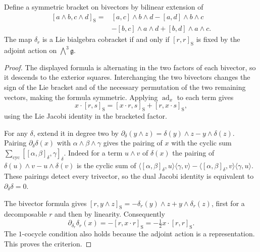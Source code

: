 \begin{proposition}
\label{res:LD05}
Define a symmetric bracket on bivectors by bilinear extension of
\[
 \begin{aligned}
 [a\wedge b,c\wedge d]_{\mathrm S}
   ={}&[a,c]\wedge b\wedge d-[a,d]\wedge b\wedge c\\
      &-[b,c]\wedge a\wedge d+[b,d]\wedge a\wedge c .
 \end{aligned}
\]
The map \(\delta_r\) is a Lie bialgebra cobracket if and only if
\([r,r]_{\mathrm S}\) is fixed by the adjoint action
on \(\bigwedge^3\mathfrak g\).
\end{proposition}
\begin{proof}
The displayed formula is alternating in the two factors of
each bivector, so it descends to the exterior squares.
Interchanging the two bivectors changes the sign of the Lie
bracket and of the necessary permutation of the two remaining
vectors, making the formula symmetric. Applying
\(\operatorname{ad}_x\) to each term gives
\[
 x\cdot[r,s]_{\mathrm S}=[x\cdot r,s]_{\mathrm S}
                         +[r,x\cdot s]_{\mathrm S},
\]
using the Lie Jacobi identity in the bracketed factor.

For any \(\delta\), extend it in degree two by
\(\partial_\delta(y\wedge z)=\delta(y)\wedge z-y\wedge\delta(z)\).
Pairing \(\partial_\delta\delta(x)\) with \(\alpha\wedge\beta\wedge\gamma\)
gives the pairing of \(x\) with the cyclic sum
\(\sum_{\mathrm{cyc}}[[\alpha,\beta]_\delta,\gamma]_\delta\).
Indeed for a term \(u\wedge v\) of \(\delta(x)\) the pairing of
\(\delta(u)\wedge v-u\wedge\delta(v)\) is the cyclic sum of
\(
\langle[\alpha,\beta]_\delta,u\rangle\langle\gamma,v\rangle
-\langle[\alpha,\beta]_\delta,v\rangle\langle\gamma,u\rangle
\).
These pairings detect every trivector, so the dual Jacobi
identity is equivalent to \(\partial_\delta\delta=0\).

The bivector formula gives
\([r,y\wedge z]_{\mathrm S}=-\delta_r(y)\wedge z+
y\wedge\delta_r(z)\), first for a decomposable \(r\)
and then by linearity. Consequently
\[
 \partial_{\delta_r}\delta_r(x)
      =-[r,x\cdot r]_{\mathrm S}
      =-\tfrac12 x\cdot[r,r]_{\mathrm S}.
\]
The \(1\)-cocycle condition also holds because the adjoint
action is a representation. This proves the criterion.
\end{proof}

